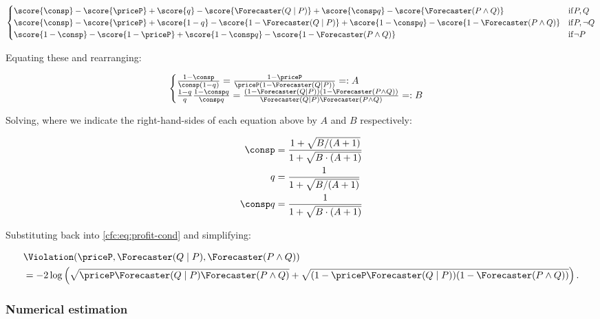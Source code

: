 \begin{equation}
\begin{cases}
\score{\consp}-\score{\priceP}+\score{\consq}-\score{\priceQgivenP}+\score{\consp\consq}-\score{\pricePandQ}
& \mathrm{if } P,Q\\
\score{\consp}-\score{\priceP}+\score{1-\consq}-\score{1-\priceQgivenP}+\score{1-\consp\consq}-\score{1-\pricePandQ}
& \mathrm{if } P,\lnot Q\\
\score{1-\consp}-\score{1-\priceP}+\score{1-\consp\consq}-\score{1-\pricePandQ}
& \mathrm{if } \lnot P
\end{cases}
\label{cfc:eq:profit-cond}
\end{equation}

Equating these and rearranging:

\begin{equation*}
    \begin{cases}
    \frac{1-\consp}{\consp (1-\consq)} = \frac{1-\priceP}{\priceP(1-\priceQgivenP)} =: A\\
    \frac{1-\consq}{\consq}\frac{1-\consp\consq}{\consp\consq} = \frac{(1-\priceQgivenP)(1-\pricePandQ)}{\priceQgivenP\pricePandQ} =: B
    \end{cases}
\end{equation*}

Solving, where we indicate the right-hand-sides of each equation above by $A$ and $B$ respectively:

\begin{align*}
    \consp &= \frac{1 + \sqrt{B/(A+1)}}{1+\sqrt{B\cdot(A+1)}}\\
    \consq &= \frac{1}{1+\sqrt{B/(A+1)}}\\
    \consp\consq &= \frac{1}{1+\sqrt{B\cdot(A+1)}}
\end{align*}

Substituting back into \ref{cfc:eq:profit-cond} and simplifying:

\begin{align*}
&\Violation(\priceP,\priceQgivenP,\pricePandQ) \\ &= -2\log\left(\sqrt{\priceP\priceQgivenP\pricePandQ}+\sqrt{(1-\priceP\priceQgivenP)(1-\pricePandQ)}\right).
\end{align*}

\subsubsection{Numerical estimation}
\label{cfc:sec:arbitrage-numerical}

